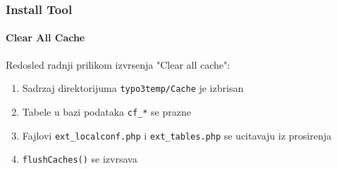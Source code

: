 
\begin{frame}[fragile]
	\frametitle{Install Tool}
	\framesubtitle{Clear All Cache}

	Redosled radnji prilikom izvrsenja "Clear all cache":

	\begin{enumerate}
		\item Sadrzaj direktorijuma \texttt{typo3temp/Cache} je izbrisan
		\item Tabele u bazi podataka \texttt{cf\_*} se prazne
		\item Fajlovi \texttt{ext\_localconf.php} i \texttt{ext\_tables.php}\newline
			se ucitavaju iz prosirenja
		\item \texttt{flushCaches()} se izvrsava
	\end{enumerate}

\end{frame}


